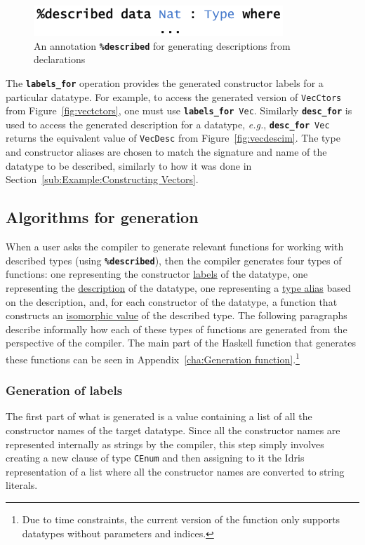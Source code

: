 \documentclass{ituthesis}
\newcommand{\tttype}[1]{\textcolor{type-color}{\texttt{#1}}}
\newcommand{\ttdec}[1]{\textcolor{declared-var-color}{\texttt{#1}}}
\theoremstyle{break}
\begin{document}
\begin{figure}
\begin{center}
    \includegraphics[scale=0.5]{Figures/NatDeclarationGen.png}
\end{center}
\caption{An annotation \texttt{\textbf{\%described}} for generating descriptions from declarations}
\label{fig:natdeclgen}
\end{figure}

The \texttt{\textbf{labels\_for}} operation provides the generated constructor labels for a particular datatype.
For example, to access the generated version of \ttdec{VecCtors} from Figure~\ref{fig:vectctors}, one must use \texttt{\textbf{labels\_for}}~\tttype{Vec}.
Similarly \texttt{\textbf{desc\_for}} is used to access the generated description for a datatype, \textit{e.g.}, \texttt{\textbf{desc\_for}}~\tttype{Vec} returns the equivalent value of \ttdec{VecDesc} from Figure~\ref{fig:vecdescim}.
The type and constructor aliases are chosen to match the signature and name of the datatype to be described, similarly to how it was done in Section~\ref{sub:Example:Constructing Vectors}.

\subsection{Algorithms for generation}
\label{sub:Algorithms for generation}
When a user asks the compiler to generate relevant functions for working with described types (using \texttt{\textbf{\%described}}), then the compiler generates four types of functions:
one representing the constructor \underline{labels} of the datatype, one representing the \underline{description} of the datatype, one representing a \underline{type alias} based on the description, and, for each constructor of the datatype, a function that constructs an \underline{isomorphic value} of the described type.
The following paragraphs describe informally how each of these types of functions are generated from the perspective of the compiler.
The main part of the Haskell function that generates these functions can be seen in Appendix~\ref{cha:Generation function}.\footnote{Due to time constraints, the current version of the function only supports datatypes without parameters and indices.}

\subsubsection{Generation of labels}
\label{ssub:Generation of labels}
The first part of what is generated is a value containing a list of all the constructor names of the target datatype.
Since all the constructor names are represented internally as strings by the compiler, this step simply involves creating a new clause of type \tttype{CEnum} and then assigning to it the Idris representation of a list where all the constructor names are converted to string literals.
\end{document}

